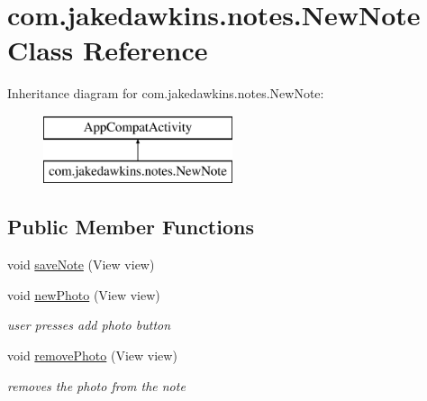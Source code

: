 \hypertarget{classcom_1_1jakedawkins_1_1notes_1_1_new_note}{}\section{com.\+jakedawkins.\+notes.\+New\+Note Class Reference}
\label{classcom_1_1jakedawkins_1_1notes_1_1_new_note}
Inheritance diagram for com.\+jakedawkins.\+notes.\+New\+Note\+:\begin{figure}[H]
\begin{center}
\leavevmode
\includegraphics[height=2.000000cm]{classcom_1_1jakedawkins_1_1notes_1_1_new_note}
\end{center}
\end{figure}
\subsection*{Public Member Functions}
\begin{DoxyCompactItemize}
\item 
void \hyperlink{classcom_1_1jakedawkins_1_1notes_1_1_new_note_ab67e5f45d753178431b8f30bf027b63a}{save\+Note} (View view)
\item 
void \hyperlink{classcom_1_1jakedawkins_1_1notes_1_1_new_note_a18447103f8d0ad6611cb1fc082cd28b0}{new\+Photo} (View view)\hypertarget{classcom_1_1jakedawkins_1_1notes_1_1_new_note_a18447103f8d0ad6611cb1fc082cd28b0}{}\label{classcom_1_1jakedawkins_1_1notes_1_1_new_note_a18447103f8d0ad6611cb1fc082cd28b0}

\begin{DoxyCompactList}\small\item\em user presses add photo button \end{DoxyCompactList}\item 
void \hyperlink{classcom_1_1jakedawkins_1_1notes_1_1_new_note_ad92ba94cc2ee93cf75608fb418e8fffd}{remove\+Photo} (View view)\hypertarget{classcom_1_1jakedawkins_1_1notes_1_1_new_note_ad92ba94cc2ee93cf75608fb418e8fffd}{}\label{classcom_1_1jakedawkins_1_1notes_1_1_new_note_ad92ba94cc2ee93cf75608fb418e8fffd}

\begin{DoxyCompactList}\small\item\em removes the photo from the note \end{DoxyCompactList}\end{DoxyCompactItemize}
